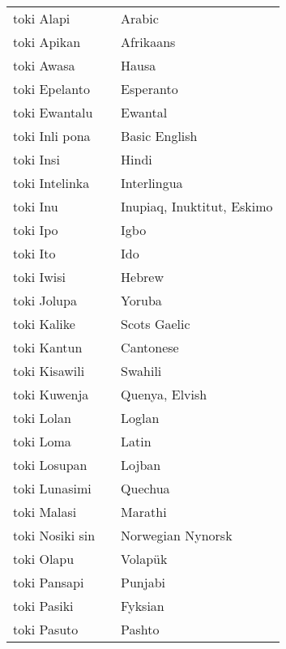 \begin{supertabular}{p{4,5cm}|ll}
    toki Alapi      &  & Arabic                     \\
    toki Apikan     &  & Afrikaans                  \\
    toki Awasa      &  & Hausa                      \\
    toki Epelanto   &  & Esperanto                  \\
    toki Ewantalu   &  & Ewantal                    \\
    toki Inli pona  &  & Basic English              \\
    toki Insi       &  & Hindi                      \\
    toki Intelinka  &  & Interlingua                \\
    toki Inu        &  & Inupiaq, Inuktitut, Eskimo \\
    toki Ipo        &  & Igbo                       \\
    toki Ito        &  & Ido                        \\
    toki Iwisi      &  & Hebrew                     \\
    toki Jolupa     &  & Yoruba                     \\
    toki Kalike     &  & Scots Gaelic               \\
    toki Kantun     &  & Cantonese                  \\
    toki Kisawili   &  & Swahili                    \\
    toki Kuwenja    &  & Quenya, Elvish             \\
    toki Lolan      &  & Loglan                     \\
    toki Loma       &  & Latin                      \\
    toki Losupan    &  & Lojban                     \\
    toki Lunasimi   &  & Quechua                    \\
    toki Malasi     &  & Marathi                    \\
    toki Nosiki sin &  & Norwegian Nynorsk          \\
    toki Olapu      &  & Volapük                    \\
    toki Pansapi    &  & Punjabi                    \\
    toki Pasiki     &  & Fyksian                    \\
    toki Pasuto     &  & Pashto                     \\

\end{supertabular}
